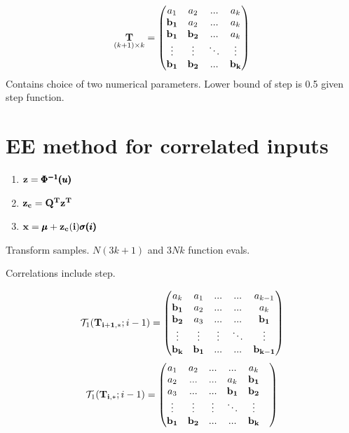 \documentclass[a4paper,12pt]{article}
\begin{document}
\begin{align}
\underset{(k+1)\times k}{\bold{T}} =
\begin{pmatrix}
a_1 & a_2 & ... & a_k \\
\bold{b_1} & a_2 & ... & a_k \\
\bold{b_1} & \bold{b_2} & ... & a_k \\
\vdots & \vdots & 	\ddots & \vdots\\
\bold{b_1} & \bold{b_2} & ... & \bold{b_k}
\end{pmatrix}
\end{align}\newpage
Contains choice of two numerical parameters. Lower bound of step is 0.5 given step function.

\section{EE method for correlated inputs}


	\begin{enumerate}
	\item $\bold{z} = \pmb{\Phi^{-1}({u})}$
	\item $\bold{z_c} = \bold{Q^T z^T}$
	\item $\bold{x} = \pmb{\mu} + \bold{z_c(i)}\pmb{\sigma(i)}$
	\end{enumerate}

Transform samples. $N(3k+1)$ and $3Nk$ function evals.


Correlations include step.

\begin{align} \label{eq:t1_min}
\mathcal{T}_1(\bold{T_{i+1,*}}; i-1)
=
\begin{pmatrix}
a_k & a_1 & ... & ... &  a_{k-1} \\
\bold{b_1} & a_2 & ... & ... &  a_k \\
\bold{b_2} & a_3 & ... & ... &  \bold{b_1} \\
\vdots & \vdots & \vdots & 	\ddots &  \vdots\\
\bold{b_k} & \bold{b_{1}} & ... & ... &  \bold{b_{k-1}}
\end{pmatrix}
\end{align}
\begin{align} \label{eq:t1_sub}
\mathcal{T}_1(\bold{T_{i,*}}; i-1)=
\begin{pmatrix}
a_1 & a_2 & ... & ... &  a_k \\
a_2 & ... & ... &  a_k & \bold{b_1} \\
a_3 & ... & ... &  \bold{b_1} & \bold{b_2} & \\
\vdots & \vdots & \vdots & 	\ddots &  \vdots\\
\bold{b_1} & \bold{b_{2}} & ... & ... &  \bold{b_{k}}
\end{pmatrix}
\end{align}
\end{document}
